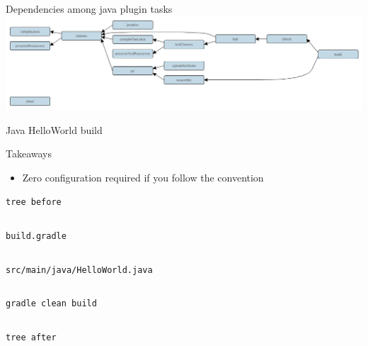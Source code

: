 \documentclass[presentation]{beamer}
\newcommand{\codefile}[4]{
	\begin{block}{\texttt{#2}}
		\inputminted[fontsize=#3,linenos=true,breaklines=true]{#4}{"workspace/#1/#2"}
	\end{block}
}
\newcommand{\java}[3]{\codefile{#1}{#2}{#3}{java}}
\newcommand{\groovy}[3]{\codefile{#1}{#2}{#3}{groovy}}
\newcommand{\terminal}[3]{\codefile{#1}{#2}{#3}{text}}
\begin{document}
\begin{frame}[fragile]{Dependencies among java plugin tasks}
    \includegraphics[width=\textwidth]{img/javaPluginTasks}
\end{frame}

\begin{frame}{Java HelloWorld build}
    \begin{block}{Takeaways}
        \begin{itemize}
            \item Zero configuration required if you follow the convention
        \end{itemize}
    \end{block}
    \terminal{13-Java}{tree before}{\normalsize}
    \groovy{13-Java}{build.gradle}{\normalsize}
    \java{13-Java}{src/main/java/HelloWorld.java}{\normalsize}
    \terminal{13-Java}{gradle clean build}{\scriptsize}
    \terminal{13-Java}{tree after}{\scriptsize}
\end{frame}
\end{document}
